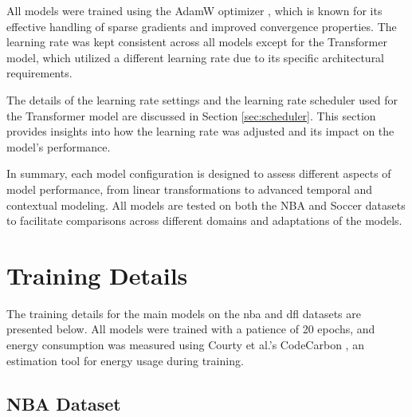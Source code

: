 All models were trained using the AdamW optimizer \cite{adamw}, which is known for its effective handling of sparse gradients and improved convergence properties. The learning rate was kept consistent across all models except for the Transformer model, which utilized a different learning rate due to its specific architectural requirements.

The details of the learning rate settings and the learning rate scheduler used for the Transformer model are discussed in Section \ref{sec:scheduler}. This section provides insights into how the learning rate was adjusted and its impact on the model's performance.

In summary, each model configuration is designed to assess different aspects of model performance, from linear transformations to advanced temporal and contextual modeling. All models are tested on both the NBA and Soccer datasets to facilitate comparisons across different domains and adaptations of the models.


\section{Training Details}
\label{sec:training_details}

The training details for the main models on the \gls{nba} and \gls{dfl} datasets are presented below. All models were trained with a patience of 20 epochs, and energy consumption was measured using Courty et al.'s CodeCarbon \cite{codecarbon}, an estimation tool for energy usage during training.

\subsection{NBA Dataset}

